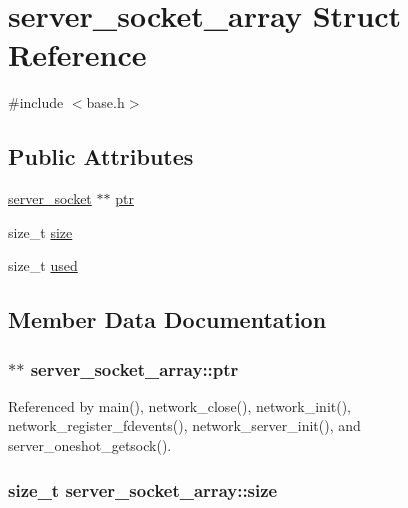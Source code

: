 \hypertarget{structserver__socket__array}{\section{server\-\_\-socket\-\_\-array Struct Reference}
\label{structserver__socket__array}
}


{\ttfamily \#include $<$base.\-h$>$}

\subsection*{Public Attributes}
\begin{DoxyCompactItemize}
\item 
\hyperlink{structserver__socket}{server\-\_\-socket} $\ast$$\ast$ \hyperlink{structserver__socket__array_ac1e027c864aa4b92eb67b1d2667c3edc}{ptr}
\item 
size\-\_\-t \hyperlink{structserver__socket__array_a0379c7f5cc9e1d9e479a76c9801041c2}{size}
\item 
size\-\_\-t \hyperlink{structserver__socket__array_a61406275cac3bc6d50290af40afbb5be}{used}
\end{DoxyCompactItemize}


\subsection{Member Data Documentation}
\hypertarget{structserver__socket__array_ac1e027c864aa4b92eb67b1d2667c3edc}{
\subsubsection[{ptr}]{$\ast$$\ast$ server\-\_\-socket\-\_\-array\-::ptr}}\label{structserver__socket__array_ac1e027c864aa4b92eb67b1d2667c3edc}


Referenced by main(), network\-\_\-close(), network\-\_\-init(), network\-\_\-register\-\_\-fdevents(), network\-\_\-server\-\_\-init(), and server\-\_\-oneshot\-\_\-getsock().

\hypertarget{structserver__socket__array_a0379c7f5cc9e1d9e479a76c9801041c2}{
\subsubsection[{size}]{\setlength{\rightskip}{0pt plus 5cm}size\-\_\-t server\-\_\-socket\-\_\-array\-::size}}\label{structserver__socket__array_a0379c7f5cc9e1d9e479a76c9801041c2}


